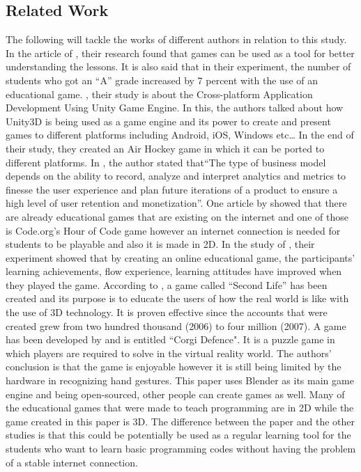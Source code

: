 \documentclass[journal]{./IEEE/IEEEtran}
\begin{document}
\begin{justify}
\section{\textbf{Related Work}}The following will tackle the works of different authors in relation to this study. In the article of \cite{educ_game}, their research found that games can be used as a tool for better understanding the lessons. It is also said that in their experiment, the number of students who got an “A” grade increased by 7 percent with the use of an educational game. \cite{cross_plat}, their study is about the Cross-platform Application Development Using Unity Game Engine. 
In this, the authors talked about how Unity3D is being used as a game engine and its power to create and present games to different platforms including Android, iOS, Windows etc… In the end of their study, they created an Air Hockey game in which it can be ported to different platforms. In \cite{cross_plat}, the author stated that``The type of business model depends on the ability to record, analyze and interpret analytics and metrics to finesse the user experience and plan future iterations of a product to ensure a high level of user retention and monetization”\cite{engagement}.  One article by \cite{kids} showed that there are already 
educational games that are existing on the internet and one of those is Code.org’s Hour of Code game however an internet connection is needed for students to be playable and also it is made in 2D. 
In the study of \cite{performance}, their experiment showed that by creating an online educational game, the participants’ learning achievements, flow experience, learning attitudes have improved when they played the game.
According to \cite{virtual_reality}, a game called ``Second Life” has been created and its purpose is to educate the users of how the real world is like with the use of 3D technology. It is proven effective since the accounts that were created grew from two hundred thousand (2006) to four million (2007). A game has been developed by \cite{corgi} and is entitled ``Corgi Defence".
It is a puzzle game in which players are required to solve in the virtual reality world. The authors' conclusion is that the game is enjoyable however it is still being limited by the hardware in recognizing hand gestures.
	This paper uses Blender as its main game engine and being open-sourced, other people can create games as well. Many of the educational games that were made to teach programming are in 2D while the game created in this paper is 3D. The difference between the paper and the other studies is that this could be potentially be used as a regular learning tool for the students who want to learn basic programming codes without having the problem of a stable internet connection.



\end{justify}
\end{document}

